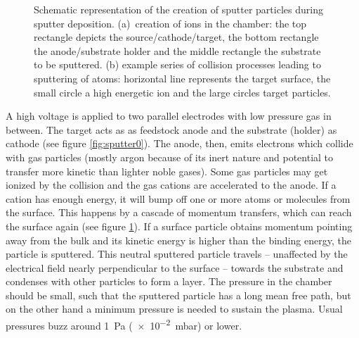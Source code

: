 \begin{figure}[tbh]
\begin{subfigure}[t]{.3\textwidth}
        \caption{}
        \label{fig:sputter1}
    \end{subfigure}
    \caption{Schematic representation of the creation of sputter particles during sputter deposition. 
    (a)~creation of ions in the chamber: 
        the top rectangle depicts the source/cathode/target, 
        the bottom rectangle the anode/substrate holder and 
        the middle rectangle the substrate to be sputtered. 
    (b) example series of collision processes leading to sputtering of atoms: 
        horizontal line represents the target surface, 
        the small circle a high energetic ion and 
        the large circles target particles. 
    }
	\label{fig:sputter}
\end{figure}

A high voltage is applied to 
two parallel electrodes with low pressure gas in between. 
The target acts as as feedstock anode and the substrate (holder) as cathode (see figure \ref{fig:sputter0}).
The anode, then, emits electrons which collide with gas particles (mostly argon because of its inert nature and potential to transfer more kinetic than lighter noble gases). 
Some gas particles may get ionized by the collision and the gas cations are accelerated to the anode. 
If a cation has enough energy, it will bump off one or more atoms or molecules from the surface. 
This happens by a cascade of momentum transfers, which can reach the surface again (see figure \ref{fig:sputter1}). 
If a surface particle obtains momentum pointing away from the bulk and its kinetic energy is higher than the binding energy, the particle is sputtered. 
This neutral sputtered particle travels -- unaffected by the electrical field nearly perpendicular to the surface -- towards the substrate and condenses with other particles to form a layer.
The pressure in the chamber should be small, such that the sputtered particle has a long mean free path, but on the other hand 
a minimum pressure is needed to sustain the plasma.
Usual pressures buzz around \SI{1}{\Pa} (\num{e-2}\SI{}{\milli\bar}) or lower\cite{Swann1988}.

